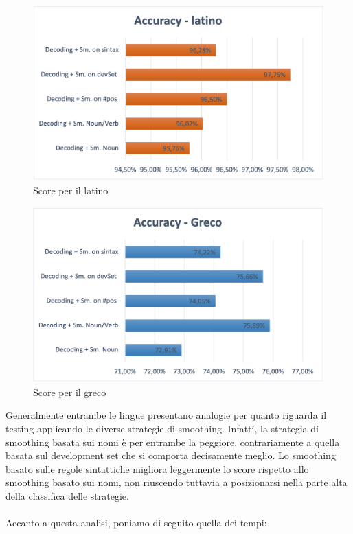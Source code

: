 \documentclass[12pt]{article}
\begin{document}
\begin{figure}[H]
   \centering
   \includegraphics[scale=0.5]{fig/AccuracyLatino.png}
   \caption{Score per il latino}\label{fig:scoreLatino}
\end{figure}

\begin{figure}[H]
   \centering
   \includegraphics[scale=0.5]{fig/AccuracyGreco.png}
   \caption{Score per il greco}\label{fig:scoreGreco}
\end{figure}

Generalmente entrambe le lingue presentano analogie per quanto riguarda il testing applicando le diverse strategie di smoothing.
Infatti, la strategia di smoothing basata sui nomi è per entrambe la peggiore, contrariamente a quella basata sul development set che si comporta decisamente meglio.
Lo smoothing basato sulle regole sintattiche migliora leggermente lo score rispetto allo smoothing basato sui nomi, non riuscendo tuttavia a posizionarsi nella parte alta della classifica delle strategie.
\\
\\Accanto a questa analisi, poniamo di seguito quella dei tempi:
\end{document}
